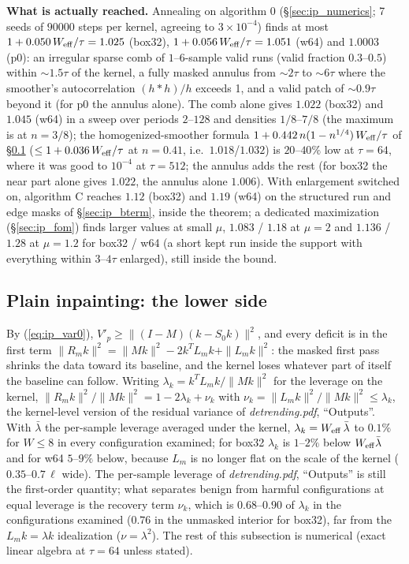 \documentclass{article}
\numberwithin{equation}{section}   %
\newcommand{\dtnotes}[1]{{\em detrending.pdf}, ``#1''}
\begin{document}
{\bf What is actually reached.}  Annealing on algorithm 0 (\S\ref{sec:ip_numerics}; 7 seeds of $90000$
steps per kernel, agreeing to $3 \times 10^{-4}$) finds at most $1 + 0.050\,W_{\rm eff}/\tau = 1.025$
(box32), $1 + 0.056\,W_{\rm eff}/\tau = 1.051$ (w64) and $1.0003$ (p0): an irregular sparse comb of
$1$--$6$-sample valid runs (valid fraction $0.3$--$0.5$) within $\sim 1.5\tau$ of the kernel, a fully
masked annulus from $\sim 2\tau$ to $\sim 6\tau$ where the smoother's autocorrelation $(h*h)/h$ exceeds 1,
and a valid patch of $\sim 0.9\tau$ beyond it (for p0 the annulus alone).  The comb alone gives $1.022$
(box32) and $1.045$ (w64) in a sweep over periods $2$--$128$ and densities $1/8$--$7/8$ (the maximum is at
$n = 3/8$); the homogenized-smoother formula $1 + 0.442\,n(1 - n^{1/4})\,W_{\rm eff}/\tau$ of
\S\ref{sec:ip_lower0} ($\le 1 + 0.036\,W_{\rm eff}/\tau$ at $n = 0.41$, i.e.\ $1.018$/$1.032$) is
$20$--$40\%$ low at $\tau = 64$, where it was good to $10^{-4}$ at $\tau = 512$; the annulus adds the rest
(for box32 the near part alone gives $1.022$, the annulus alone $1.006$).  With enlargement switched on,
algorithm C reaches $1.12$ (box32) and $1.19$ (w64) on the structured run and edge masks of
\S\ref{sec:ip_bterm}, inside the theorem; a dedicated maximization (\S\ref{sec:ip_fom}) finds larger
values at small $\mu$, $1.083$ / $1.18$ at $\mu = 2$ and $1.136$ / $1.28$ at $\mu = 1.2$ for box32 / w64 (a
short kept run inside the support with everything within $3$--$4\tau$ enlarged), still inside the bound.

\subsection{Plain inpainting: the lower side}
\label{sec:ip_lower0}

By (\ref{eq:ip_var0}), $V'_p \ge \|(I - M)(k - S_0k)\|^2$, and every deficit is in the first term
$\|R_mk\|^2 = \|Mk\|^2 - 2k^TL_mk + \|L_mk\|^2$: the masked first pass shrinks the data toward its
baseline, and the kernel loses whatever part of itself the baseline can follow.  Writing
$\lambda_k = k^TL_mk/\|Mk\|^2$ for the leverage on the kernel, $\|R_mk\|^2/\|Mk\|^2 = 1 - 2\lambda_k +
\nu_k$ with $\nu_k = \|L_mk\|^2/\|Mk\|^2 \le \lambda_k$, the kernel-level version of the residual variance
of \dtnotes{Outputs}.  With $\bar\lambda$ the per-sample leverage averaged under the kernel,
$\lambda_k = W_{\rm eff}\,\bar\lambda$ to $0.1\%$ for $W \le 8$ in every configuration examined; for
box32 $\lambda_k$ is $1$--$2\%$ below $W_{\rm eff}\bar\lambda$ and for w64 $5$--$9\%$ below, because
$L_m$ is no longer flat on the scale of the kernel ($0.35$--$0.7\,\ell$ wide).  The per-sample leverage
of \dtnotes{Outputs} is still the first-order quantity; what separates benign from harmful
configurations at equal leverage is the recovery term $\nu_k$, which is $0.68$--$0.90$ of $\lambda_k$ in
the configurations examined ($0.76$ in the unmasked interior for box32), far from the
$L_mk = \lambda k$ idealization ($\nu = \lambda^2$).  The rest of this subsection is numerical (exact
linear algebra at $\tau = 64$ unless stated).
\end{document}
